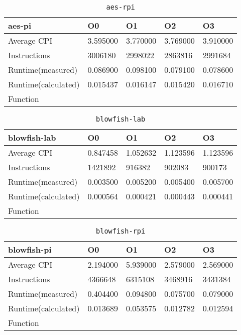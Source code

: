 \begin{table}[ht!]
\centering
\caption{\texttt{aes-rpi}}
\label{tab:aes-rpi}
\begin{tabular}{|l|l|l|l|l|}
\hline
\textbf{aes-pi}	&	\textbf{O0}	&	\textbf{O1}	&	\textbf{O2}	&	\textbf{O3}	\\\hline\hline
Average CPI	&	3.595000	&	3.770000	&	3.769000	&	3.910000	\\\hline
Instructions	&	3006180	&	2998022	&	2863816	&	2991684	\\\hline
Runtime(measured)	&	0.086900	&	0.098100	&	0.079100	&	0.078600	\\\hline
Runtime(calculated)	&	0.015437	&	0.016147	&	0.015420	&	0.016710	\\\hline
Function	&		&		&		&		\\\hline
\end{tabular}
\end{table}
\begin{table}[ht!]
\centering
\caption{\texttt{blowfish-lab}}
\label{tab:blowfish-lab}
\begin{tabular}{|l|l|l|l|l|}
\hline
\textbf{blowfish-lab}	&	\textbf{O0}	&	\textbf{O1}	&	\textbf{O2}	&	\textbf{O3}	\\\hline\hline
Average CPI	&	0.847458	&	1.052632	&	1.123596	&	1.123596	\\\hline
Instructions	&	1421892	&	916382	&	902083	&	900173	\\\hline
Runtime(measured)	&	0.003500	&	0.005200	&	0.005400	&	0.005700	\\\hline
Runtime(calculated)	&	0.000564	&	0.000421	&	0.000443	&	0.000441	\\\hline
Function	&		&		&		&		\\\hline
\end{tabular}
\end{table}
\begin{table}[ht!]
\centering
\caption{\texttt{blowfish-rpi}}
\label{tab:blowfish-rpi}
\begin{tabular}{|l|l|l|l|l|}
\hline
\textbf{blowfish-pi}	&	\textbf{O0}	&	\textbf{O1}	&	\textbf{O2}	&	\textbf{O3}	\\\hline\hline
Average CPI	&	2.194000	&	5.939000	&	2.579000	&	2.569000	\\\hline
Instructions	&	4366648	&	6315108	&	3468916	&	3431384	\\\hline
Runtime(measured)	&	0.404400	&	0.094800	&	0.075700	&	0.079000	\\\hline
Runtime(calculated)	&	0.013689	&	0.053575	&	0.012782	&	0.012594	\\\hline
Function	&		&		&		&		\\\hline
\end{tabular}
\end{table}
